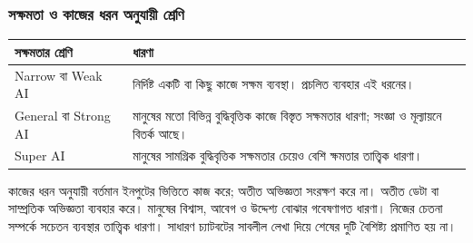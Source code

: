 \begin{topicbody}
\subsubsection{সক্ষমতা ও কাজের ধরন অনুযায়ী শ্রেণি}
\begin{compacttable}
\begin{tabular}{|p{}|p{}|}
\hline\textbf{সক্ষমতার শ্রেণি} & \textbf{ধারণা}\\\hline
Narrow বা Weak AI & নির্দিষ্ট একটি বা কিছু কাজে সক্ষম ব্যবস্থা। প্রচলিত ব্যবহার এই ধরনের।\\\hline
General বা Strong AI & মানুষের মতো বিভিন্ন বুদ্ধিবৃত্তিক কাজে বিস্তৃত সক্ষমতার ধারণা; সংজ্ঞা ও মূল্যায়নে বিতর্ক আছে।\\\hline
Super AI & মানুষের সামগ্রিক বুদ্ধিবৃত্তিক সক্ষমতার চেয়েও বেশি ক্ষমতার তাত্ত্বিক ধারণা।\\\hline
\end{tabular}
\end{compacttable}
কাজের ধরন অনুযায়ী  বর্তমান ইনপুটের ভিত্তিতে কাজ করে; অতীত অভিজ্ঞতা সংরক্ষণ করে না।  অতীত ডেটা বা সাম্প্রতিক অভিজ্ঞতা ব্যবহার করে।  মানুষের বিশ্বাস, আবেগ ও উদ্দেশ্য বোঝার গবেষণাগত ধারণা।  নিজের চেতনা সম্পর্কে সচেতন ব্যবস্থার তাত্ত্বিক ধারণা। সাধারণ চ্যাটবটের সাবলীল লেখা দিয়ে শেষের দুটি বৈশিষ্ট্য প্রমাণিত হয় না।

\end{topicbody}
